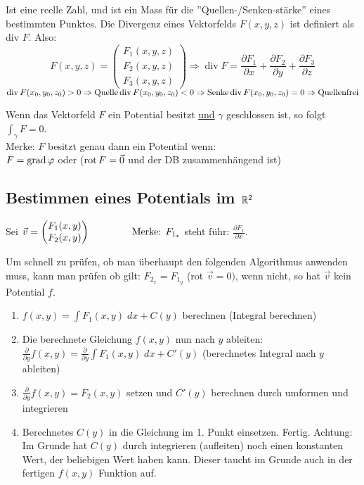 \begin{definition}[Divergenz]
Ist eine reelle Zahl, und ist ein Mass für die ''Quellen-/Senken-stärke'' eines bestimmten Punktes. 
Die Divergenz eines Vektorfelds $F(x, y, z)$ ist definiert als div $F$. Also:
\[
F(x, y, z) = 
\left(
	\begin{array}{c}
		F_1 (x, y, z) \\
		F_2 (x, y, z) \\
		F_3 (x, y, z)
	\end{array}
\right) \Rightarrow
	\operatorname{div} F = \frac{\partial F_1}{\partial x} + \frac{\partial F_2}{\partial y} + 
	\frac{\partial F_3}{\partial z}
\] 
$
\operatorname{div} F(x_0, y_0, z_0) > 0 \Rightarrow \text{Quelle}\\
\operatorname{div} F(x_0, y_0, z_0) < 0 \Rightarrow \text{Senke}\\
\operatorname{div} F(x_0, y_0, z_0) = 0 \Rightarrow \text{Quellenfrei}
$
\end{definition}

\begin{lemma}
Wenn das Vektorfeld $F$ ein Potential besitzt \uline{und} $\gamma$ geschlossen ist, so folgt $\int_\gamma F = 0$.\\
Merke: $F$ besitzt genau dann ein Potential wenn:\\
$F = \operatorname{grad} \varphi$ oder ($\operatorname{rot} F = \vec{0}$ und der DB zusammenhängend ist)
\end{lemma}

\pagebreak
\subsection{Bestimmen eines Potentials im $\mathbb{R}^2$}
Sei $\vec{v} = \begin{pmatrix}
F_1(x,y)\\
F_2(x,y)
\end{pmatrix} \hspace{1.5cm} \text{Merke: } F_{1_x}$ steht führ: $\frac{\partial F_1}{\partial x}$.

Um schnell zu prüfen, ob man überhaupt den folgenden Algorithmus anwenden muss,
kann man prüfen ob gilt: $F_{2_x} = F_{1_y}$ (rot $\vec{v} = 0)$, wenn nicht, so hat $\vec{v}$ kein Potential $f$.

\begin{enumerate}[itemsep=1em]
	\item $f(x,y) = \int F_1(x,y)\;dx + C(y)$ berechnen (Integral berechnen)
	\item Die berechnete Gleichung $f(x,y)$ nun nach $y$ ableiten:
	$\frac{\partial}{\partial y} f(x,y) = \frac{\partial}{\partial y}\int F_1(x,y)\;dx + C'(y)$
	(berechnetes Integral nach $y$ ableiten)
	\item $\frac{\partial}{\partial y} f(x,y) = F_2(x,y)$ setzen und $C'(y)$ berechnen durch umformen
	und integrieren
	\item Berechnetes $C(y)$ in die Gleichung im 1. Punkt einsetzen. Fertig. Achtung: Im Grunde hat
	$C(y)$ durch integrieren (aufleiten) noch einen konstanten Wert, der beliebigen Wert haben kann.
	Dieser taucht im Grunde auch in der fertigen $f(x,y)$ Funktion auf.
\end{enumerate}

